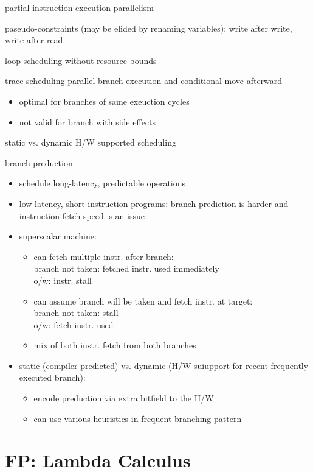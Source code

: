 \documentclass[8pt]{extarticle}
\begin{document}
\begin{multicols*}{2}
  partial instruction execution parallelism

  paseudo-constraints (may be elided by renaming variables): write after write, write after read

  loop scheduling without resource bounds

  trace scheduling
  parallel branch execution and conditional move afterward
  \begin{itemize}
  \item optimal for branches of same exeuction cycles
  \item not valid for branch with side effects
  \end{itemize}

  static vs. dynamic H/W supported scheduling

  branch preduction
  \begin{itemize}
  \item schedule long-latency, predictable operations
  \item low latency, short instruction programs: branch prediction is harder and instruction fetch speed is an issue
  \item superscalar machine:
    \begin{itemize}
    \item can fetch multiple instr. after branch:\\
      branch not taken: fetched instr. used immediately\\
      o/w: instr. stall
    \item can assume branch will be taken and fetch instr. at target:\\
      branch not taken: stall\\
      o/w: fetch instr. used
    \item mix of both instr. fetch from both branches
    \end{itemize}
  \item static (compiler predicted) vs. dynamic (H/W suiupport for recent frequently executed branch):
    \begin{itemize}
    \item encode preduction via extra bitfield to the H/W
    \item can use various heuristics in frequent branching pattern
    \end{itemize}
  \end{itemize}
    
  \vfill\null
  \columnbreak

  \section{FP: Lambda Calculus \cite{peyton1987}}


\end{multicols*}
\end{document}
